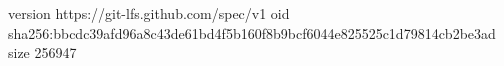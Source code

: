 version https://git-lfs.github.com/spec/v1
oid sha256:bbcdc39afd96a8c43de61bd4f5b160f8b9bcf6044e825525c1d79814cb2be3ad
size 256947
